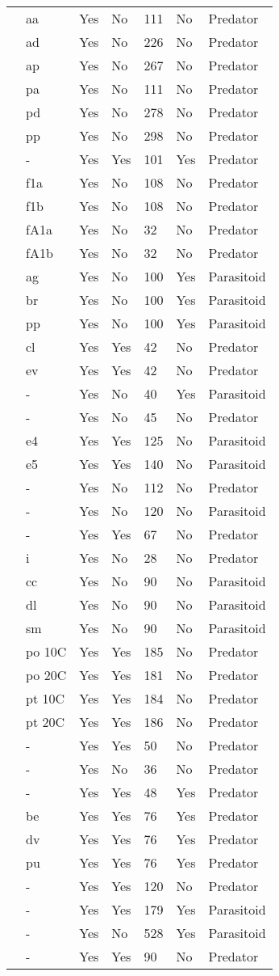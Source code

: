 \begin{table}[!tbp]
\begin{center}
\begin{tabular}{lllllll}
\citet{Eveleigh:1982aa}&aa&Yes&No&111&No&Predator\tabularnewline
\citet{Eveleigh:1982aa}&ad&Yes&No&226&No&Predator\tabularnewline
\citet{Eveleigh:1982aa}&ap&Yes&No&267&No&Predator\tabularnewline
\citet{Eveleigh:1982aa}&pa&Yes&No&111&No&Predator\tabularnewline
\citet{Eveleigh:1982aa}&pd&Yes&No&278&No&Predator\tabularnewline
\citet{Eveleigh:1982aa}&pp&Yes&No&298&No&Predator\tabularnewline
\citet{Fussmann:2005aa}&-&Yes&Yes&101&Yes&Predator\tabularnewline
\citet{Griffen:2007aa}&f1a&Yes&No&108&No&Predator\tabularnewline
\citet{Griffen:2007aa}&f1b&Yes&No&108&No&Predator\tabularnewline
\citet{Griffen:2007aa}&fA1a&Yes&No&32&No&Predator\tabularnewline
\citet{Griffen:2007aa}&fA1b&Yes&No&32&No&Predator\tabularnewline
\citet{Hassan:1976aa}&ag&Yes&No&100&Yes&Parasitoid\tabularnewline
\citet{Hassan:1976aa}&br&Yes&No&100&Yes&Parasitoid\tabularnewline
\citet{Hassan:1976aa}&pp&Yes&No&100&Yes&Parasitoid\tabularnewline
\citet{Hossie:2016aa}&cl&Yes&Yes&42&No&Predator\tabularnewline
\citet{Hossie:2016aa}&ev&Yes&Yes&42&No&Predator\tabularnewline
\citet{Huffaker:1982aa}&-&Yes&No&40&Yes&Parasitoid\tabularnewline
\citet{Johnson:2006aa}&-&Yes&No&45&No&Predator\tabularnewline
\citet{Jones:1988aa}&e4&Yes&Yes&125&No&Parasitoid\tabularnewline
\citet{Jones:1988aa}&e5&Yes&Yes&140&No&Parasitoid\tabularnewline
\citet{Katz:1985ai}&-&Yes&No&112&No&Predator\tabularnewline
\citet{Kfir:1983aa}&-&Yes&No&120&No&Parasitoid\tabularnewline
\citet{Kratina:2009aa}&-&Yes&Yes&67&No&Predator\tabularnewline
\citet{Krylov:1992aa}&i&Yes&No&28&No&Predator\tabularnewline
\citet{Kumar:1985aa}&cc&Yes&No&90&No&Parasitoid\tabularnewline
\citet{Kumar:1985aa}&dl&Yes&No&90&No&Parasitoid\tabularnewline
\citet{Kumar:1985aa}&sm&Yes&No&90&No&Parasitoid\tabularnewline
\citet{Lang:2012aa}&po 10C&Yes&Yes&185&No&Predator\tabularnewline
\citet{Lang:2012aa}&po 20C&Yes&Yes&181&No&Predator\tabularnewline
\citet{Lang:2012aa}&pt 10C&Yes&Yes&184&No&Predator\tabularnewline
\citet{Lang:2012aa}&pt 20C&Yes&Yes&186&No&Predator\tabularnewline
\citet{Long:2012aa}&-&Yes&Yes&50&No&Predator\tabularnewline
\citet{Mansour:1991aa}&-&Yes&No&36&No&Predator\tabularnewline
\citet{Medoc:2013aa}&-&Yes&Yes&48&Yes&Predator\tabularnewline
\citet{Medoc:2015aa}&be&Yes&Yes&76&Yes&Predator\tabularnewline
\citet{Medoc:2015aa}&dv&Yes&Yes&76&Yes&Predator\tabularnewline
\citet{Medoc:2015aa}&pu&Yes&Yes&76&Yes&Predator\tabularnewline
\citet{Mertz:1968aa}&-&Yes&Yes&120&No&Predator\tabularnewline
\citet{Mills:2004aa}&-&Yes&Yes&179&Yes&Parasitoid\tabularnewline
\citet{Montoya:2000aa}&-&Yes&No&528&Yes&Parasitoid\tabularnewline
\citet{Omkar:2004aa}&-&Yes&Yes&90&No&Predator\tabularnewline

\end{tabular}
\end{center}
\end{table}
